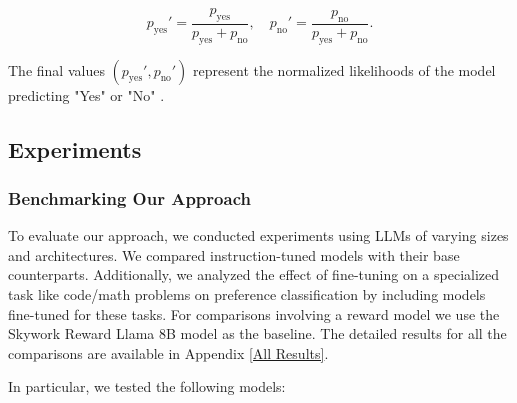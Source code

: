 


\begin{equation}
p_{\text{yes}}' = \frac{p_{\text{yes}}}{p_{\text{yes}} + p_{\text{no}}}, \quad 
p_{\text{no}}' = \frac{p_{\text{no}}}{p_{\text{yes}} + p_{\text{no}}}.
\end{equation}

The final values \( (p_{\text{yes}}', p_{\text{no}}') \) represent the normalized likelihoods of the model predicting "Yes" or "No" .

\subsection{Experiments}
\subsubsection{Benchmarking Our Approach}

To evaluate our approach, we conducted experiments using LLMs of varying sizes and architectures. We compared instruction-tuned models with their base counterparts. Additionally, we analyzed the effect of fine-tuning on a specialized task like code/math problems on preference classification by including models fine-tuned for these tasks. For comparisons involving a reward model we use the Skywork Reward Llama 8B model \cite{liu2024skywork} as the baseline.
The detailed results for all the comparisons are available in Appendix \ref{All Results}.

In particular, we tested the following models:


